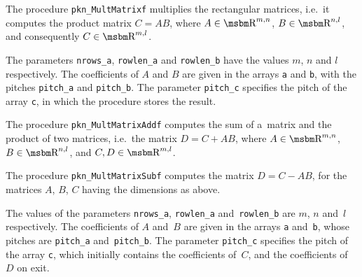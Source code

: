 \vspace{\bigskipamount}
The procedure \texttt{pkn\_MultMatrixf} multiplies the rectangular matrices,
i.e.\ it computes the product matrix $C=AB$, where $A\in\R^{m,n}$,
$B\in\R^{n,l}$, and consequently $C\in\R^{m,l}$.

The parameters \texttt{nrows\_a},
\texttt{rowlen\_a} and \texttt{rowlen\_b} have the values $m$, $n$
and $l$ respectively. The coefficients of $A$ and $B$ are given in the arrays
\texttt{a} and \texttt{b}, with the pitches \texttt{pitch\_a}
and \texttt{pitch\_b}. The parameter \texttt{pitch\_c} specifies the pitch
of the array \texttt{c}, in which the procedure stores the result.

\vspace{\bigskipamount}
The procedure \texttt{pkn\_MultMatrixAddf} computes the sum of a~matrix and
the product of two matrices, i.e.\ the matrix $D=C+AB$, where $A\in\R^{m,n}$,
$B\in\R^{n,l}$, and $C, D\in\R^{m,l}$.

The procedure \texttt{pkn\_MultMatrixSubf} computes the matrix $D=C-AB$,
for the matrices $A$, $B$, $C$ having the dimensions as above.

The values of the parameters \texttt{nrows\_a},
\texttt{rowlen\_a} and~\texttt{rowlen\_b} are $m$, $n$
and~$l$ respectively. The coefficients of $A$ and~$B$ are given in
the arrays
\texttt{a} and~\texttt{b}, whose pitches are \texttt{pitch\_a}
and~\texttt{pitch\_b}. The parameter \texttt{pitch\_c} specifies the pitch of
the array
\texttt{c}, which initially contains the coefficients of~$C$, and
the coefficients of~$D$ on exit.



